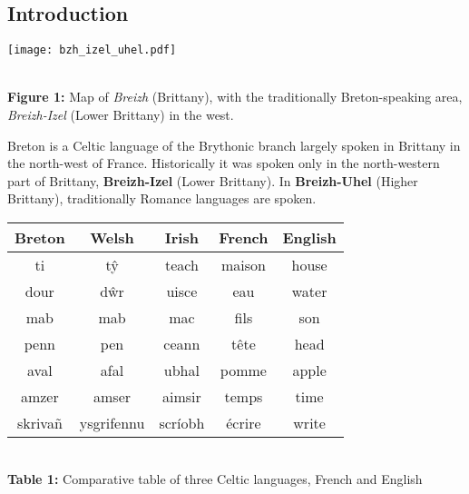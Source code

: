\documentclass[a0,landscape]{a0poster}
\begin{document}
\begin{multicols}{4}

\newlength{\figwidth}
\setlength{\figwidth}{20cm}

\newlength{\fighalfwidth}
\setlength{\fighalfwidth}{10cm}


\section{Introduction}

\begin{center}
\begin{minipage}[b]{20cm}
\centering
\texttt{[image: bzh\_izel\_uhel.pdf]}
\end{minipage}\\
\vspace{0.5cm}
\textbf{Figure 1:} Map of \emph{Breizh} (Brittany), with the traditionally Breton-speaking area, \emph{Breizh-Izel} (Lower Brittany) 
in the west.
\end{center}
\vspace{1.0cm}

\noindent
Breton is a Celtic language of the Brythonic branch largely spoken in Brittany in the north-west
of France. Historically it was spoken only in the north-western part of Brittany, \textbf{Breizh-Izel} 
(Lower Brittany). In \textbf{Breizh-Uhel} (Higher Brittany), traditionally Romance languages are spoken.

\vspace{1.5cm}
\begin{center}
\begin{tabular}{c|c|c|c|c}
\hline
{\bf Breton}  & {\bf Welsh}      & {\bf Irish}  & {\bf French} & {\bf English}\\
\hline
ti      & t\^y       & teach   & maison & house \\
dour    & d\^wr      & uisce   & eau & water \\
mab     & mab        & mac     & fils & son \\
penn    & pen        & ceann   & tête & head \\
aval    & afal       & ubhal   & pomme & apple \\ 
amzer   & amser      & aimsir  & temps & time \\
skrivañ & ysgrifennu & scríobh & écrire & write\\
\hline
\end{tabular}\\
\vspace{0.5cm}
\textbf{Table 1:} Comparative table of three Celtic languages, French and English
\end{center}
\vspace{0.5cm}


\end{multicols}
\end{document}
